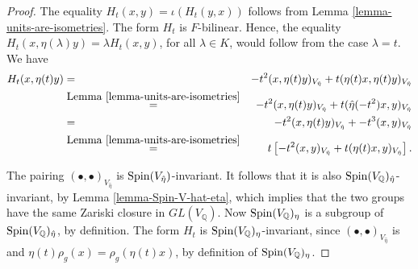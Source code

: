 \documentclass[12pt]{amsart}
\newcommand{\hide}[1]{}
\numberwithin{equation}{subsection}
\theoremstyle{plain}
\theoremstyle{definition}
\newcommand{\QQ}{{\mathbb Q}}
\newcommand{\Spin}{{\rm Spin}}
\begin{document}
{\begin{proof}
The equality $H_t(x,y)=\iota(H_t(y,x))$ follows from Lemma \ref{lemma-units-are-isometries}. The form $H_t$ is $F$-bilinear. Hence, the equality 
$H_t(x,\eta(\lambda)y)=\lambda H_t(x,y)$, for all $\lambda\in K$, would follow from the case $\lambda=t$. We have
\begin{eqnarray*}
H_t(x,\eta(t)y)&=& -t^2(x,\eta(t)y)_{V_{\hat{\eta}}}+t(\eta(t)x,\eta(t)y)_{V_{\hat{\eta}}}
\\
&\stackrel{\mbox{Lemma \ref{lemma-units-are-isometries}}}{=}&
-t^2(x,\eta(t)y)_{V_{\hat{\eta}}}+t(\hat{\eta}(-t^2)x,y)_{V_{\hat{\eta}}}
\\
&=&-t^2(x,\eta(t)y)_{V_{\hat{\eta}}}+-t^3(x,y)_{V_{\hat{\eta}}}
\\
&\stackrel{\mbox{Lemma \ref{lemma-units-are-isometries}}}{=}&
t\left[
-t^2(x,y)_{V_{\hat{\eta}}}+t(\eta(t)x,y)_{V_{\hat{\eta}}}
\right].
\end{eqnarray*}

The pairing $(\bullet,\bullet)_{V_{\hat{\eta}}}$ is $\Spin(V_{\hat{\eta}})$-invariant. It follows that it is also $\Spin(V_\QQ)_{\hat{\eta}}$-invariant, by Lemma \ref{lemma-Spin-V-hat-eta}, which implies that the two groups have the same Zariski closure in $GL(V_\QQ)$. Now $\Spin(V_\QQ)_\eta$ is a subgroup of $\Spin(V_\QQ)_{\hat{\eta}}$, by definition.
The form $H_t$ is $\Spin(V_\QQ)_\eta$-invariant, since $(\bullet,\bullet)_{V_{\hat{\eta}}}$ is and $\eta(t)\rho_g(x)=\rho_g(\eta(t)x)$, by definition of $\Spin(V_\QQ)_\eta$.
\end{proof}

\hide{
\begin{proof}
It suffices to prove the equality $H_{t,T}=T\circ H_t$.
The embedding $T:K\rightarrow F\otimes_\QQ\tilde{K}$ restricts to $F$ as the standard embedding of $F$ in $F\otimes_\QQ\tilde{F}$. 
Now,
\begin{eqnarray*}
H_{t,T}(x,y)&=&T(-t^2)\left[T\left((x,y)_{V_{\hat{\eta}}}\right)+T(t)T\left((\eta(t)x,y)_{V_{\hat{\eta}}}\right)
\right]
\\
&=&T\left[
(-t^2)(x,y)_{V_{\hat{\eta}}}+t(\eta(t)x,y)_{V_{\hat{\eta}}}
\right]=T(H_t(x,y)).
\end{eqnarray*}
\end{proof}
}

}
\end{document}
